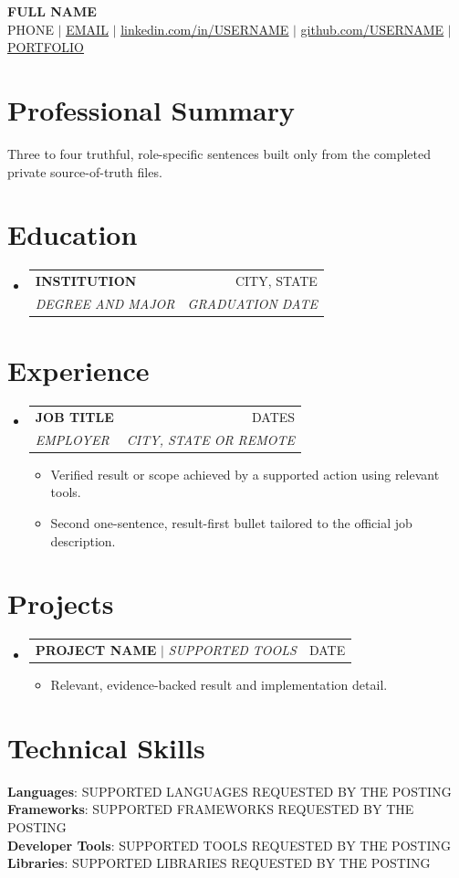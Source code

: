 \documentclass[letterpaper,11pt]{article}
\makeatletter
\newcommand{\resumeItem}[1]{
  \item\small{
    {#1 \vspace{-2pt}}
  }
}
\newcommand{\resumeSubheading}[4]{
  \vspace{-2pt}\item
    \begin{tabular*}{0.97\textwidth}[t]{l@{\extracolsep{\fill}}r}
      \textbf{#1} & #2 \\
      \textit{\small#3} & \textit{\small #4} \\
    \end{tabular*}\vspace{-7pt}
}
\newcommand{\resumeProjectHeading}[2]{
  \item
    \begin{tabular*}{0.97\textwidth}{l@{\extracolsep{\fill}}r}
      \small#1 & #2 \\
    \end{tabular*}\vspace{-7pt}
}
\newcommand{\resumeSubHeadingListStart}{\begin{itemize}[leftmargin=0.15in, label={}]}
\newcommand{\resumeSubHeadingListEnd}{\end{itemize}}
\newcommand{\resumeItemListStart}{\begin{itemize}}
\newcommand{\resumeItemListEnd}{\end{itemize}\vspace{-5pt}}
\makeatother
\begin{document}
\begin{center}
  \textbf{\Huge \scshape FULL NAME} \\ \vspace{1pt}
  \small PHONE $|$ \href{mailto:EMAIL}{\underline{EMAIL}} $|$
  \href{https://linkedin.com/in/USERNAME}{\underline{linkedin.com/in/USERNAME}} $|$
  \href{https://github.com/USERNAME}{\underline{github.com/USERNAME}} $|$
  \href{https://example.com}{\underline{PORTFOLIO}}
\end{center}

\section{Professional Summary}
\small{Three to four truthful, role-specific sentences built only from the completed private source-of-truth files.}

\section{Education}
\resumeSubHeadingListStart
  \resumeSubheading
    {INSTITUTION}{CITY, STATE}
    {DEGREE AND MAJOR}{GRADUATION DATE}
\resumeSubHeadingListEnd

\section{Experience}
\resumeSubHeadingListStart
  \resumeSubheading
    {JOB TITLE}{DATES}
    {EMPLOYER}{CITY, STATE OR REMOTE}
    \resumeItemListStart
      \resumeItem{Verified result or scope achieved by a supported action using relevant tools.}
      \resumeItem{Second one-sentence, result-first bullet tailored to the official job description.}
    \resumeItemListEnd
\resumeSubHeadingListEnd

\section{Projects}
\resumeSubHeadingListStart
  \resumeProjectHeading
    {\textbf{PROJECT NAME} $|$ \emph{SUPPORTED TOOLS}}{DATE}
    \resumeItemListStart
      \resumeItem{Relevant, evidence-backed result and implementation detail.}
    \resumeItemListEnd
\resumeSubHeadingListEnd

\section{Technical Skills}
\begin{itemize}[leftmargin=0.15in, label={}]
  \small{\item{
    \textbf{Languages}{: SUPPORTED LANGUAGES REQUESTED BY THE POSTING} \\
    \textbf{Frameworks}{: SUPPORTED FRAMEWORKS REQUESTED BY THE POSTING} \\
    \textbf{Developer Tools}{: SUPPORTED TOOLS REQUESTED BY THE POSTING} \\
    \textbf{Libraries}{: SUPPORTED LIBRARIES REQUESTED BY THE POSTING}
  }}
\end{itemize}

\end{document}
